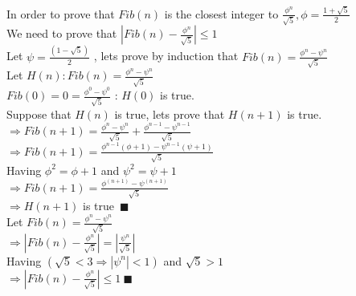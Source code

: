 \documentclass{article}
\begin{document}
\noindent In order to prove that $Fib(n)$ is the closest integer
to $\frac{\phi^n}{\sqrt{5}}, \phi = \frac{1+\sqrt{5}}{2}$\\
We need to prove that $ |Fib(n) -  \frac{\phi^n}{\sqrt{5}}| \leq 1$\\

\noindent Let $\psi = \frac{( 1 - \sqrt{5})}{2}$ , lets prove by induction that
$Fib(n) = \frac{\phi^n - \psi^n}{\sqrt{5}}$\\
Let $H(n) : Fib(n) = \frac{\phi^n - \psi^n}{\sqrt{5}}$\\
$Fib(0) = 0 = \frac{\phi^0 - \psi^0}{\sqrt{5}}$ : $H(0)$ is true.\\
Suppose that $H(n)$ is true, lets prove that $H(n+1)$ is true.\\
$\Rightarrow Fib(n+1) = \frac{\phi^n - \psi^n}{\sqrt{5}}
+ \frac{\phi^{n-1} - \psi^{n-1}}{\sqrt{5}}$\\
$\Rightarrow Fib(n+1) = \frac{\phi^{n-1}(\phi + 1) - \psi^{n-1}(\psi + 1)}{\sqrt{5}}$\\
Having $\phi^2 = \phi + 1$ and $\psi^2 = \psi + 1$\\
$\Rightarrow Fib(n+1) = \frac{\phi^{(n+1)} - \psi^{(n+1)}}{\sqrt{5}}$\\
$\Rightarrow H(n+1)$ is true\ $\blacksquare$\\

\noindent Let $Fib(n) = \frac{\phi^n - \psi^n}{\sqrt{5}}$\\
$\Rightarrow |Fib(n) - \frac{\phi^n}{\sqrt{5}}| = |\frac{\psi^n}{\sqrt{5}}|$ \\
Having $(\sqrt{5} < 3 \Rightarrow |\psi^n| < 1)$ and $ \sqrt{5} > 1$\\
$\Rightarrow |Fib(n) -  \frac{\phi^n}{\sqrt{5}}| \leq 1 \ \blacksquare$
\end{document}
